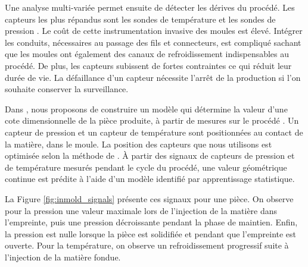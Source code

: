 Une analyse multi-variée permet ensuite de détecter les dérives du procédé.
Les capteurs les plus répandus sont les sondes de température et les sondes de pression \cite{kurt_experimental_2009}.
Le coût de cette instrumentation invasive des moules est élevé.
Intégrer les conduits, nécessaires au passage des fils et connecteurs, est compliqué sachant que les moules ont également des canaux de refroidissement indispensables au procédé.
De plus, les capteurs subissent de fortes contraintes ce qui réduit leur durée de vie.
La défaillance d'un capteur nécessite l'arrêt de la production si l'on souhaite conserver la surveillance.


Dans , nous proposons de construire un modèle qui détermine la valeur d'une cote dimensionnelle de la pièce produite, à partir de mesures sur le procédé \cite{nagorny_quality_2017}.
Un capteur de pression et un capteur de température sont positionnées au contact de la matière, dans le moule.
La position des capteurs que nous utilisons est optimisée selon la méthode de \citeauthor{agazzi_optimal_2013} \cite{agazzi_optimal_2013}.
À partir des signaux de capteurs de pression et de température mesurés pendant le cycle du procédé, une valeur géométrique continue est prédite à l'aide d'un modèle identifié par apprentissage statistique.

La Figure \ref{fig:inmold_signals} présente ces signaux pour une pièce.
On observe pour la pression une valeur maximale lors de l'injection de la matière dans l'empreinte, puis une pression décroissante pendant la phase de maintien. Enfin, la pression est nulle lorsque la pièce est solidifiée et pendant que l'empreinte est ouverte.
Pour la température, on observe un refroidissement progressif suite à l'injection de la matière fondue.

